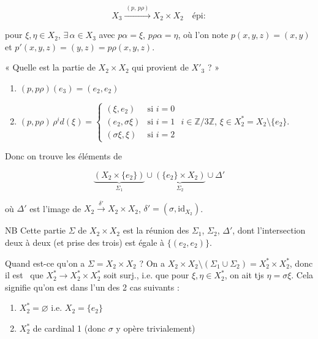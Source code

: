 \documentclass[11pt,a4paper]{article}
\begin{document}
\[
  X_3 \xrightarrow{\ (p,\,p\rho)\ } X_2 \times X_2 \quad \text{épi} :
\]

pour $\xi, \eta \in X_2$, $\exists\,\alpha \in X_3$ avec $p\alpha = \xi$,
$p\rho\alpha = \eta$, où l'on note $p(x,y,z) = (x,y)$ et
$p'(x,y,z) = (y,z) = p\rho(x,y,z)$.

« Quelle est la partie de $X_2 \times X_2$ qui provient de $X'_3$ ? »

\begin{enumerate}
  \item[a)] $(p,p\rho)(e_3) = (e_2,e_2)$
  \item[b)] $\displaystyle (p,p\rho)\,\rho^i d(\xi) =
    \begin{cases}
      (\xi, e_2) & \text{si } i = 0 \\
      (e_2, \sigma\xi) & \text{si } i = 1 \\
      (\sigma\xi, \xi) & \text{si } i = 2
    \end{cases}$
    \quad $i \in \mathbb{Z}/3\mathbb{Z}$, $\xi \in X^{*}_2 = X_2\setminus\{e_2\}$.
\end{enumerate}

Donc on trouve les éléments de

\[
  \underbrace{(X_2 \times \{e_2\})}_{\Sigma_1} \cup
  \underbrace{(\{e_2\} \times X_2)}_{\Sigma_2} \cup \Delta'
\]

où $\Delta'$ est l'image de $X_2 \xrightarrow{\ \delta'\ } X_2 \times X_2$,
$\delta' = (\sigma, \mathrm{id}_{X_2})$.

NB Cette partie $\Sigma$ de $X_2 \times X_2$ est la réunion des $\Sigma_1$,
$\Sigma_2$, $\Delta'$, dont l'intersection deux à deux (et prise des trois) est
égale à $\{(e_2,e_2)\}$.

Quand est-ce qu'on a $\Sigma = X_2 \times X_2$ ? On a
$X_2 \times X_2 \setminus (\Sigma_1 \cup \Sigma_2) = X^{*}_2 \times X^{*}_2$,
donc il est \ill\ que $X^{*}_2 \to X^{*}_2 \times X^{*}_2$ soit surj., i.e. que
pour $\xi, \eta \in X^{*}_2$, on ait tjs $\eta = \sigma\xi$. Cela signifie
qu'on est dans l'un des 2 cas suivants :

\begin{enumerate}
  \item[a)] $X^{*}_2 = \varnothing$ i.e. $X_2 = \{e_2\}$
  \item[b)] $X^{*}_2$ de cardinal 1 (donc $\sigma$ y opère trivialement)
\end{enumerate}
\end{document}
